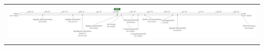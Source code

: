 \begin{landscape}
\begin{table}[H]
{\begin{tabular}{lllllll}
\multicolumn{7}{l}{}                                                                                                                                                                                                                                                                                                                                                                                                                                                                                                                                                                                                                                                                                                                                                                                                                                            \\
\multicolumn{7}{c}{\includegraphics[width=2\linewidth]{source/status_report/main/init_timeline}}                                                                                                                                                                                                                                                                                                                                                                                                                                                                                                                                                                                                                                                                                                                                                                                                                                            \\
\multicolumn{7}{l}{}                                                                                                                                                                                                                                                                                                                                                                                                                                                                                                                                                                                                                                                                                                                                                                                                                                            \\

\end{tabular}}
\end{table}
\end{landscape}
